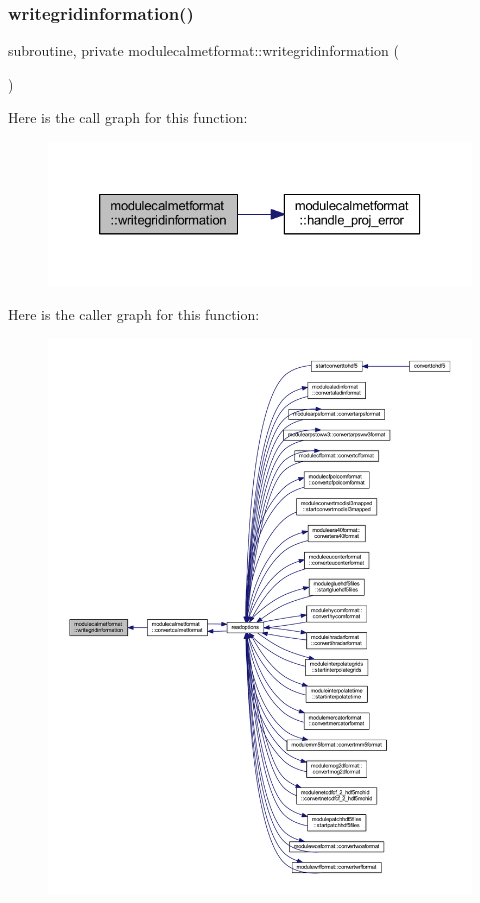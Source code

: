 \subsubsection{\texorpdfstring{writegridinformation()}{writegridinformation()}}
{\footnotesize\ttfamily subroutine, private modulecalmetformat\+::writegridinformation (\begin{DoxyParamCaption}{ }\end{DoxyParamCaption})\hspace{0.3cm}{\ttfamily [private]}}

Here is the call graph for this function\+:\nopagebreak
\begin{figure}[H]
\begin{center}
\leavevmode
\includegraphics[width=326pt]{namespacemodulecalmetformat_aed24d711f305ad0c21d58e0ff79c9c02_cgraph}
\end{center}
\end{figure}
Here is the caller graph for this function\+:\nopagebreak
\begin{figure}[H]
\begin{center}
\leavevmode
\includegraphics[width=350pt]{namespacemodulecalmetformat_aed24d711f305ad0c21d58e0ff79c9c02_icgraph}
\end{center}
\end{figure}
